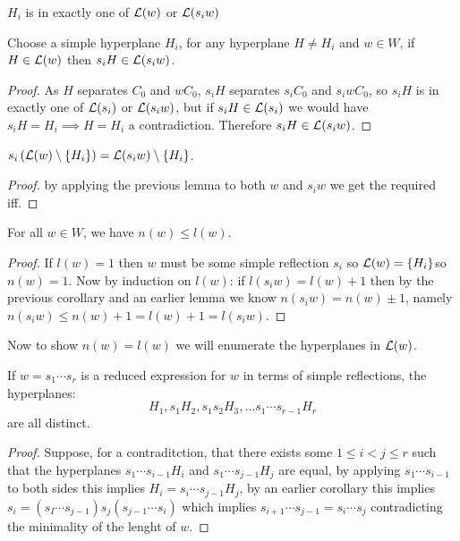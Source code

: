 \documentclass[../main.tex]{subfiles}
\begin{document}
\begin{lemma}
    $H_i$ is in exactly one of $\mathcal{L}(w)$ or $\mathcal{L}(s_i w)$
\end{lemma}

\begin{lemma}
    Choose a simple hyperplane $H_i$, for any hyperplane $H\neq H_i$ and $w\in W$, if $H\in \mathcal{L}(w)$ then $s_i H\in \mathcal{L}(s_i w)$.
    \begin{proof}
        As $H$ separates $C_0$ and $wC_0$, $s_i H$ separates $s_i C_0$ and $s_i w C_0$, so $s_i H$ is in exactly one of $\mathcal{L}(s_i)$ or $\mathcal{L}(s_i w)$, but if $s_i H \in \mathcal{L}(s_i)$ we would have $s_i H = H_i \implies H=H_i$ a contradiction. Therefore $s_i H \in \mathcal{L}(s_i w)$.
    \end{proof}
\end{lemma}

\begin{corollary}
    $s_i\left( \mathcal{L}(w)\setminus \{H_i\} \right) = \mathcal{L}(s_i w) \setminus \{H_i\}$.\begin{proof}
        by applying the previous lemma to both $w$ and $s_i w$ we get the required iff.
    \end{proof}
\end{corollary}

\begin{proposition}
    For all $w\in W$, we have $n(w)\leq l(w)$.
    \begin{proof}
        If $l(w) = 1$ then $w$ must be some simple reflection $s_i$ so $\mathcal{L}(w) = \{H_i\}$\citationneeded so $n(w)=1$. Now by induction on $l(w)$: if $l(s_i w) = l(w) + 1$ then by the previous corollary and an earlier lemma we know $n(s_i w) = n(w) \pm 1$, namely $n(s_i w) \leq n(w) + 1 = l(w) + 1 = l(s_i w)$.
    \end{proof}
\end{proposition}

Now to show $n(w)=l(w)$ we will enumerate the hyperplanes in $\mathcal{L}(w)$.

\begin{lemma}
    If $w=s_1\cdots s_r$ is a reduced expression for $w$ in terms of simple reflections, the hyperplanes:\[
        H_1, s_1 H_2, s_1s_2H_3,\ldots s_1\cdots s_{r-1} H_r
    \] are all distinct.
    \begin{proof}
        Suppose, for a contraditction, that there exists some $1\leq i < j \leq r$ such that the hyperplanes $s_1 \cdots s_{i-1} H_i$ and $s_1\cdots s_{j-1} H_j$ are equal, by applying $s_1\cdots s_{i-1}$ to both sides this implies $H_i = s_i\cdots s_{j-1}H_j$, by an earlier corollary this implies $s_i = (s_I\cdots s_{j-1})s_j(s_{j-1}\cdots s_i)$ which implies $s_{i+1}\cdots s_{j-1} = s_i\cdots s_j$ contradicting the minimality of the lenght of $w$.
    \end{proof}
\end{lemma}
\end{document}
